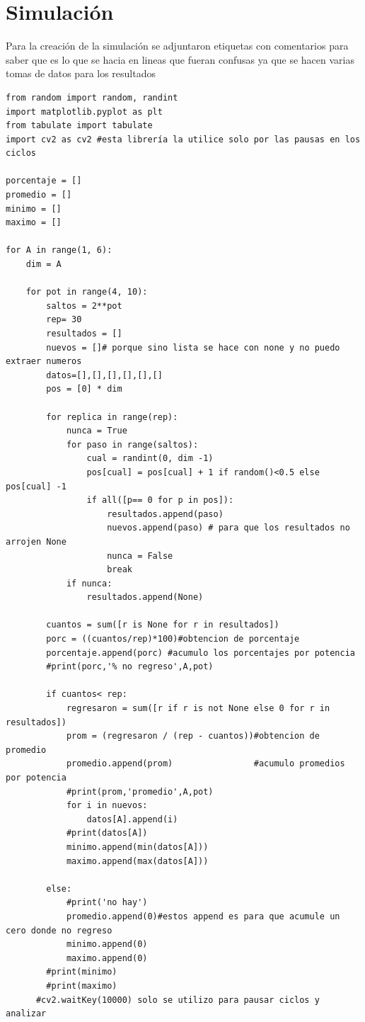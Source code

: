 \documentclass[a4paper]{article}
\begin{document}
\section{Simulación}
Para la creación de la simulación se adjuntaron etiquetas con comentarios para saber que es lo que se hacia en lineas que fueran confusas ya que se hacen varias tomas de datos para los resultados
 \begin{verbatim}
from random import random, randint
import matplotlib.pyplot as plt
from tabulate import tabulate
import cv2 as cv2 #esta librería la utilice solo por las pausas en los ciclos 

porcentaje = []
promedio = []
minimo = []
maximo = []

for A in range(1, 6):
    dim = A
    
    for pot in range(4, 10):
        saltos = 2**pot
        rep= 30
        resultados = []
        nuevos = []# porque sino lista se hace con none y no puedo extraer numeros
        datos=[],[],[],[],[],[]
        pos = [0] * dim
        
        for replica in range(rep):
            nunca = True
            for paso in range(saltos):
                cual = randint(0, dim -1)
                pos[cual] = pos[cual] + 1 if random()<0.5 else pos[cual] -1
                if all([p== 0 for p in pos]):
                    resultados.append(paso)
                    nuevos.append(paso) # para que los resultados no arrojen None
                    nunca = False
                    break
            if nunca:
                resultados.append(None)

        cuantos = sum([r is None for r in resultados])
        porc = ((cuantos/rep)*100)#obtencion de porcentaje
        porcentaje.append(porc) #acumulo los porcentajes por potencia
        #print(porc,'% no regreso',A,pot)
       
        if cuantos< rep:
            regresaron = sum([r if r is not None else 0 for r in resultados])
            prom = (regresaron / (rep - cuantos))#obtencion de promedio
            promedio.append(prom)                #acumulo promedios por potencia
            #print(prom,'promedio',A,pot)
            for i in nuevos:
                datos[A].append(i)
            #print(datos[A])
            minimo.append(min(datos[A]))
            maximo.append(max(datos[A]))
                                     
        else:
            #print('no hay')
            promedio.append(0)#estos append es para que acumule un cero donde no regreso
            minimo.append(0)
            maximo.append(0)
        #print(minimo)
        #print(maximo)
      #cv2.waitKey(10000) solo se utilizo para pausar ciclos y analizar
 \end{verbatim}
\end{document}
